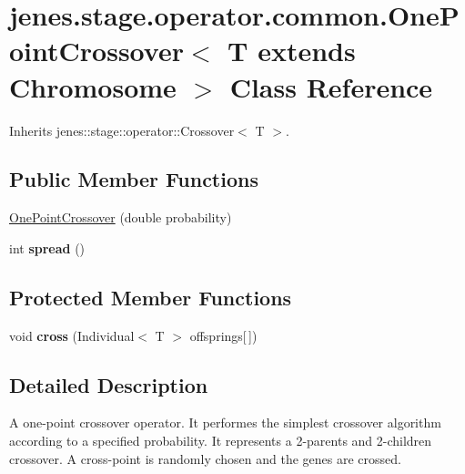 \hypertarget{classjenes_1_1stage_1_1operator_1_1common_1_1_one_point_crossover_3_01_t_01extends_01_chromosome_01_4}{
\section{jenes.stage.operator.common.OnePointCrossover$<$ T extends Chromosome $>$ Class Reference}
\label{classjenes_1_1stage_1_1operator_1_1common_1_1_one_point_crossover_3_01_t_01extends_01_chromosome_01_4}
}
Inherits jenes::stage::operator::Crossover$<$ T $>$.

\subsection*{Public Member Functions}
\begin{CompactItemize}
\item 
\hyperlink{classjenes_1_1stage_1_1operator_1_1common_1_1_one_point_crossover_3_01_t_01extends_01_chromosome_01_4_441a51f325e76aa282250ecf2c464635}{OnePointCrossover} (double probability)
\item 
\hypertarget{classjenes_1_1stage_1_1operator_1_1common_1_1_one_point_crossover_3_01_t_01extends_01_chromosome_01_4_7f29facf7cb0e3baec284ec72730c8c0}{
int \textbf{spread} ()}
\label{classjenes_1_1stage_1_1operator_1_1common_1_1_one_point_crossover_3_01_t_01extends_01_chromosome_01_4_7f29facf7cb0e3baec284ec72730c8c0}

\end{CompactItemize}
\subsection*{Protected Member Functions}
\begin{CompactItemize}
\item 
\hypertarget{classjenes_1_1stage_1_1operator_1_1common_1_1_one_point_crossover_3_01_t_01extends_01_chromosome_01_4_d8963f25110079a5444d2a0a61d3d1a5}{
void \textbf{cross} (Individual$<$ T $>$ offsprings\mbox{[}$\,$\mbox{]})}
\label{classjenes_1_1stage_1_1operator_1_1common_1_1_one_point_crossover_3_01_t_01extends_01_chromosome_01_4_d8963f25110079a5444d2a0a61d3d1a5}

\end{CompactItemize}


\subsection{Detailed Description}
A one-point crossover operator. It performes the simplest crossover algorithm according to a specified probability. It represents a 2-parents and 2-children crossover. A cross-point is randomly chosen and the genes are crossed.

